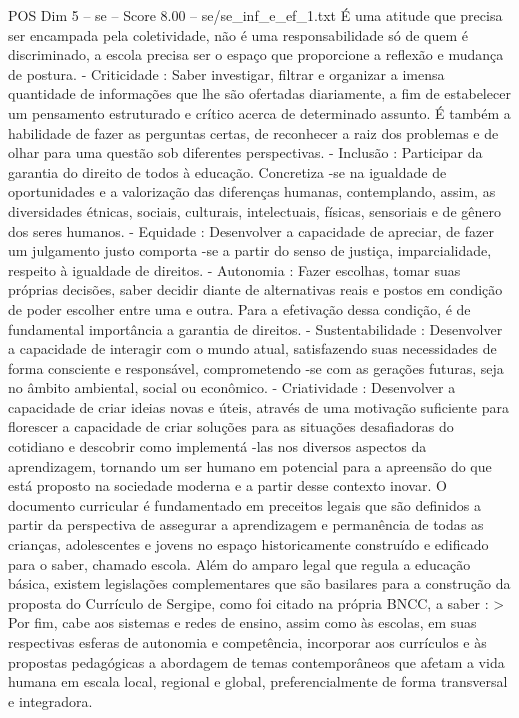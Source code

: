 \begin{textsample}{POS Dim 5 – se – Score 8.00 – se/se\_inf\_e\_ef\_1.txt}
É uma atitude que precisa ser encampada pela coletividade, não é uma responsabilidade só de quem é discriminado, a escola precisa ser o espaço que proporcione a reflexão e mudança de postura. - Criticidade : Saber investigar, filtrar e organizar a imensa quantidade de informações que lhe são ofertadas diariamente, a fim de estabelecer um pensamento estruturado e crítico acerca de determinado assunto.
É também a habilidade de fazer as perguntas certas, de reconhecer a raiz dos problemas e de olhar para uma questão sob diferentes perspectivas. - Inclusão : Participar da garantia do direito de todos à educação.
Concretiza -se na igualdade de oportunidades e a valorização das diferenças humanas, contemplando, assim, as diversidades étnicas, sociais, culturais, intelectuais, físicas, sensoriais e de gênero dos seres humanos. - Equidade : Desenvolver a capacidade de apreciar, de fazer um julgamento justo comporta -se a partir do senso de justiça, imparcialidade, respeito à igualdade de direitos. - Autonomia : Fazer escolhas, tomar suas próprias decisões, saber decidir diante de alternativas reais e postos em condição de poder escolher entre uma e outra.
Para a efetivação dessa condição, é de fundamental importância a garantia de direitos. - Sustentabilidade : Desenvolver a capacidade de interagir com o mundo atual, satisfazendo suas necessidades de forma consciente e responsável, comprometendo -se com as gerações futuras, seja no âmbito ambiental, social ou econômico. - Criatividade : Desenvolver a capacidade de criar ideias novas e úteis, através de uma motivação suficiente para florescer a capacidade de criar soluções para as situações desafiadoras do cotidiano e descobrir como implementá -las nos diversos aspectos da aprendizagem, tornando um ser humano em potencial para a apreensão do que está proposto na sociedade moderna e a partir desse contexto inovar.
O documento curricular é fundamentado em preceitos legais que são definidos a partir da perspectiva de assegurar a aprendizagem e permanência de todas as crianças, adolescentes e jovens no espaço historicamente construído e edificado para o saber, chamado escola.
Além do amparo legal que regula a educação básica, existem legislações complementares que são basilares para a construção da proposta do Currículo de Sergipe, como foi citado na própria BNCC, a saber : > Por fim, cabe aos sistemas e redes de ensino, assim como às escolas, em suas respectivas esferas de autonomia e competência, incorporar aos currículos e às propostas pedagógicas a abordagem de temas contemporâneos que afetam a vida humana em escala local, regional e global, preferencialmente de forma transversal e integradora.

\end{textsample}
